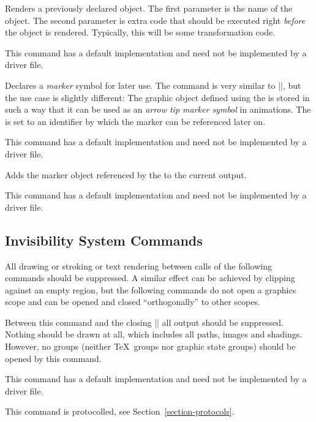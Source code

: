 \begin{command}{\pgfsys@useobject{}}
    Renders a previously declared object. The first parameter is the name of
    the object. The second parameter is extra code that should be executed
    right \emph{before} the object is rendered. Typically, this will be some
    transformation code.

    This command has a default implementation and need not be implemented by a
    driver file.
\end{command}

\begin{command}{\pgfsys@marker@declare{}}
    Declares a \emph{marker} symbol for later use. The command is very similar
    to |\pgfsys@defobject|, but the use case is slightly different: The graphic
    object defined using the  is stored in such a way that it can be
    used as an \emph{arrow tip marker symbol} in animations. The 
    is set to an identifier by which the marker can be referenced later on.

    This command has a default implementation and need not be implemented by a
    driver file.
\end{command}

\begin{command}{\pgfsys@marker@use{}}
    Adds the marker object referenced by the  to the current
    output.

    This command has a default implementation and need not be implemented by a
    driver file.
\end{command}


\subsection{Invisibility System Commands}

All drawing or stroking or text rendering between calls of the following
commands should be suppressed. A similar effect can be achieved by clipping
against an empty region, but the following commands do not open a graphics
scope and can be opened and closed ``orthogonally'' to other scopes.

\begin{command}{\pgfsys@begininvisible}
    Between this command and the closing |\pgfsys@endinvisible| all output
    should be suppressed. Nothing should be drawn at all, which includes all
    paths, images and shadings. However, no groups (neither \TeX\ groups nor
    graphic state groups) should be opened by this command.

    This command has a default implementation and need not be implemented by a
    driver file.

    This command is protocolled, see Section~\ref{section-protocols}.
\end{command}

